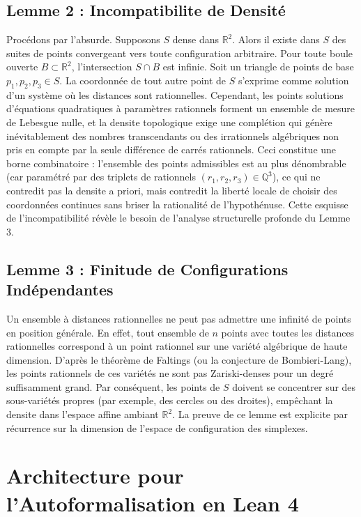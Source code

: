 \documentclass[12pt, a4paper]{article}
\begin{document}
\subsection{Lemme 2 : Incompatibilite de Densité}
Procédons par l'absurde. Supposons $S$ dense dans $\mathbb{R}^2$.
Alors il existe dans $S$ des suites de points convergeant vers toute configuration arbitraire.
Pour toute boule ouverte $B \subset \mathbb{R}^2$, l'intersection $S \cap B$ est infinie.
Soit un triangle de points de base $p_1, p_2, p_3 \in S$. La coordonnée de tout autre point de $S$ s'exprime comme solution d'un système où les distances sont rationnelles. Cependant, les points solutions d'équations quadratiques à paramètres rationnels forment un ensemble de mesure de Lebesgue nulle, et la densite topologique exige une complétion qui génère inévitablement des nombres transcendants ou des irrationnels algébriques non pris en compte par la seule différence de carrés rationnels.
Ceci constitue une borne combinatoire : l'ensemble des points admissibles est au plus dénombrable (car paramétré par des triplets de rationnels $(r_1, r_2, r_3) \in \mathbb{Q}^3$), ce qui ne contredit pas la densite a priori, mais contredit la liberté locale de choisir des coordonnées continues sans briser la rationalité de l'hypothénuse.
Cette esquisse de l'incompatibilité révèle le besoin de l'analyse structurelle profonde du Lemme 3.

\subsection{Lemme 3 : Finitude de Configurations Indépendantes}
Un ensemble à distances rationnelles ne peut pas admettre une infinité de points en position générale. En effet, tout ensemble de $n$ points avec toutes les distances rationnelles correspond à un point rationnel sur une variété algébrique de haute dimension. D'après le théorème de Faltings (ou la conjecture de Bombieri-Lang), les points rationnels de ces variétés ne sont pas Zariski-denses pour un degré suffisamment grand. Par conséquent, les points de $S$ doivent se concentrer sur des sous-variétés propres (par exemple, des cercles ou des droites), empêchant la densite dans l'espace affine ambiant $\mathbb{R}^2$. La preuve de ce lemme est explicite par récurrence sur la dimension de l'espace de configuration des simplexes.

\section{Architecture pour l'Autoformalisation en Lean 4}
\end{document}
